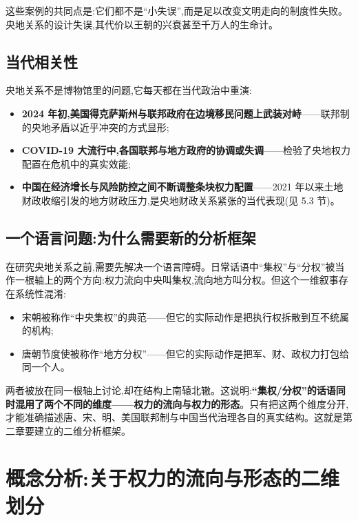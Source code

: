 \documentclass[UTF8,12pt,a4paper]{ctexrep}
\begin{document}
这些案例的共同点是:它们都不是``小失误'',而是足以改变文明走向的制度性失败。央地关系的设计失误,其代价以王朝的兴衰甚至千万人的生命计。

\section{当代相关性}

央地关系不是博物馆里的问题,它每天都在当代政治中重演:

\begin{itemize}
  \item \textbf{2024 年初,美国得克萨斯州与联邦政府在边境移民问题上武装对峙}——联邦制的央地矛盾以近乎冲突的方式显形;
  \item \textbf{COVID-19 大流行中,各国联邦与地方政府的协调或失调}——检验了央地权力配置在危机中的真实效能;
  \item \textbf{中国在经济增长与风险防控之间不断调整条块权力配置}——2021 年以来土地财政收缩引发的地方财政压力,是央地财政关系紧张的当代表现(见 5.3 节)。
\end{itemize}

\section{一个语言问题:为什么需要新的分析框架}

在研究央地关系之前,需要先解决一个语言障碍。日常话语中``集权''与``分权''被当作一根轴上的两个方向:权力流向中央叫集权,流向地方叫分权。但这个一维叙事存在系统性混淆:

\begin{itemize}
  \item 宋朝被称作``中央集权''的典范——但它的实际动作是把执行权拆散到互不统属的机构;
  \item 唐朝节度使被称作``地方分权''——但它的实际动作是把军、财、政权力打包给同一个人。
\end{itemize}

两者被放在同一根轴上讨论,却在结构上南辕北辙。这说明:\textbf{``集权/分权''的话语同时混用了两个不同的维度——权力的流向与权力的形态}。只有把这两个维度分开,才能准确描述唐、宋、明、美国联邦制与中国当代治理各自的真实结构。这就是第二章要建立的二维分析框架。

\chapter{概念分析:关于权力的流向与形态的二维划分}
\end{document}

